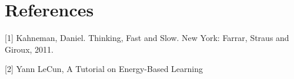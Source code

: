 \documentclass{article}
\begin{document}





% 

\section*{References}

\small

[1] Kahneman, Daniel. Thinking, Fast and Slow. New York: Farrar, Straus and Giroux, 2011. 

[2] Yann LeCun, A Tutorial on Energy-Based Learning


\end{document}
